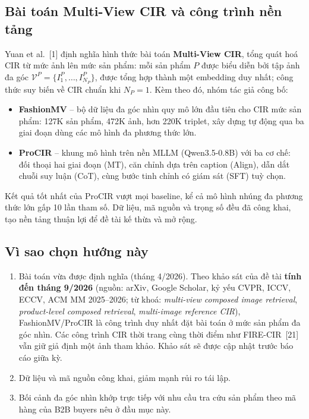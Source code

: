\documentclass[a4paper]{article}
\begin{document}
\subsection{Bài toán Multi-View CIR và công trình nền tảng}

Yuan et al.~[1] định nghĩa hình thức bài toán \textbf{Multi-View CIR}, tổng quát hoá CIR từ mức ảnh lên mức sản phẩm: mỗi sản phẩm $P$ được biểu diễn bởi tập ảnh đa góc $\mathcal{V}^P = \{I^P_1, \dots, I^P_{N_P}\}$, được tổng hợp thành một embedding duy nhất; công thức suy biến về CIR chuẩn khi $N_P = 1$. Kèm theo đó, nhóm tác giả công bố:
\begin{itemize}
\item \textbf{FashionMV} -- bộ dữ liệu đa góc nhìn quy mô lớn đầu tiên cho CIR mức sản phẩm: 127K sản phẩm, 472K ảnh, hơn 220K triplet, xây dựng tự động qua ba giai đoạn dùng các mô hình đa phương thức lớn.
\item \textbf{ProCIR} -- khung mô hình trên nền MLLM (Qwen3.5-0.8B) với ba cơ chế: đối thoại hai giai đoạn (MT), căn chỉnh dựa trên caption (Align), dẫn dắt chuỗi suy luận (CoT), cùng bước tinh chỉnh có giám sát (SFT) tuỳ chọn.
\end{itemize}
Kết quả tốt nhất của ProCIR vượt mọi baseline, kể cả mô hình nhúng đa phương thức lớn gấp 10 lần tham số. Dữ liệu, mã nguồn và trọng số đều đã công khai, tạo nền tảng thuận lợi để đề tài kế thừa và mở rộng.

\subsection{Vì sao chọn hướng này}
\begin{enumerate}[label=(\roman*)]
\item Bài toán vừa được định nghĩa (tháng 4/2026). Theo khảo sát của đề tài \textbf{tính đến tháng 9/2026} (nguồn: arXiv, Google Scholar, kỷ yếu CVPR, ICCV, ECCV, ACM MM 2025--2026; từ khoá: \textit{multi-view composed image retrieval}, \textit{product-level composed retrieval}, \textit{multi-image reference CIR}), FashionMV/ProCIR là công trình duy nhất đặt bài toán ở mức sản phẩm đa góc nhìn. Các công trình CIR thời trang cùng thời điểm như FIRE-CIR~[21] vẫn giữ giả định một ảnh tham khảo. Khảo sát sẽ được cập nhật trước báo cáo giữa kỳ.
\item Dữ liệu và mã nguồn công khai, giảm mạnh rủi ro tái lập.
\item Bối cảnh đa góc nhìn khớp trực tiếp với nhu cầu tra cứu sản phẩm theo mã hàng của B2B buyers nêu ở đầu mục này.
\end{enumerate}
\end{document}
